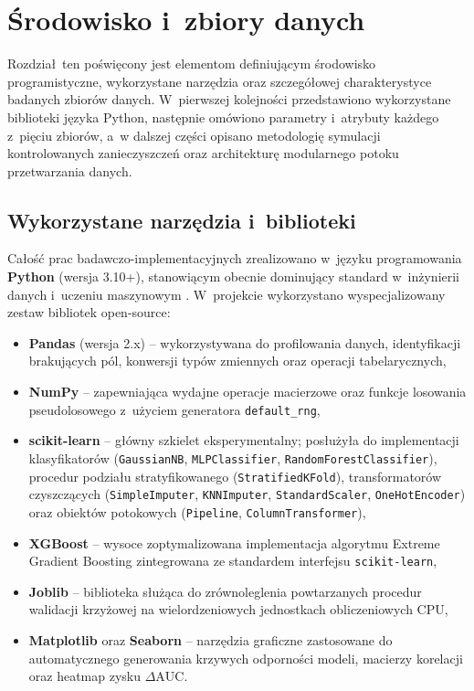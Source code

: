 \chapter{Środowisko i~zbiory danych}

Rozdział~ten poświęcony jest elementom definiującym środowisko programistyczne, wykorzystane narzędzia oraz szczegółowej charakterystyce badanych zbiorów danych. W~pierwszej kolejności przedstawiono wykorzystane biblioteki języka Python, następnie omówiono parametry i~atrybuty każdego z~pięciu zbiorów, a~w dalszej części opisano metodologię symulacji kontrolowanych zanieczyszczeń oraz architekturę modularnego potoku przetwarzania danych.

\section{Wykorzystane narzędzia i~biblioteki}
Całość prac badawczo-implementacyjnych zrealizowano w~języku programowania \textbf{Python} (wersja 3.10+), stanowiącym obecnie dominujący standard w~inżynierii danych i~uczeniu maszynowym \cite{Walker2021}. W~projekcie wykorzystano wyspecjalizowany zestaw bibliotek open-source:
\begin{itemize}
    \item \textbf{Pandas} \cite{PandasDocs} (wersja 2.x) – wykorzystywana do profilowania danych, identyfikacji brakujących pól, konwersji typów zmiennych oraz operacji tabelarycznych,
    \item \textbf{NumPy} \cite{NumpyDocs} – zapewniająca wydajne operacje macierzowe oraz funkcje losowania pseudolosowego z~użyciem generatora \texttt{default\_rng},
    \item \textbf{scikit-learn} \cite{SklearnDocs} – główny szkielet eksperymentalny; posłużyła do implementacji klasyfikatorów (\texttt{GaussianNB}, \texttt{MLPClassifier}, \texttt{RandomForestClassifier}), procedur podziału stratyfikowanego (\texttt{StratifiedKFold}), transformatorów czyszczących (\texttt{SimpleImputer}, \texttt{KNNImputer}, \texttt{StandardScaler}, \texttt{OneHotEncoder}) oraz obiektów potokowych (\texttt{Pipeline}, \texttt{ColumnTransformer}),
    \item \textbf{XGBoost} \cite{ChenGuestrin2016,XGBoostDocs} – wysoce zoptymalizowana implementacja algorytmu Extreme Gradient Boosting zintegrowana ze standardem interfejsu \texttt{scikit-learn},
    \item \textbf{Joblib} \cite{JoblibDocs} – biblioteka służąca do zrównoleglenia powtarzanych procedur walidacji krzyżowej na wielordzeniowych jednostkach obliczeniowych CPU,
    \item \textbf{Matplotlib} \cite{Hunter2007} oraz \textbf{Seaborn} \cite{Waskom2021} – narzędzia graficzne zastosowane do automatycznego generowania krzywych odporności modeli, macierzy korelacji oraz heatmap zysku $\Delta \mathrm{AUC}$.
\end{itemize}

